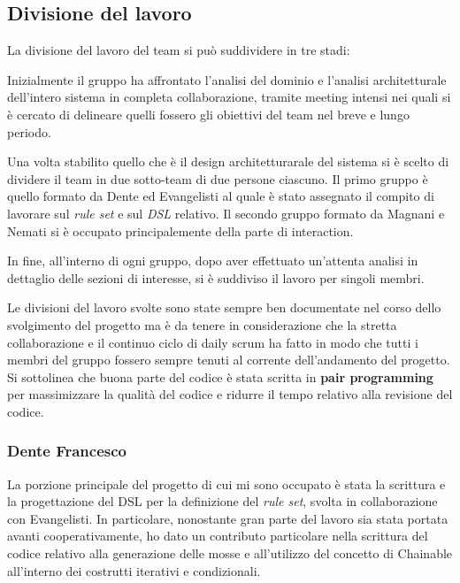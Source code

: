 
\subsection{Divisione del lavoro}
La divisione del lavoro del team si può suddividere in tre stadi:
%
\begin{inparaenum}[1)]
\item Inizialmente il gruppo ha affrontato l'analisi del dominio e l'analisi architetturale dell'intero sistema in completa collaborazione, tramite meeting intensi nei quali si è cercato di delineare quelli fossero gli obiettivi del team nel breve e lungo periodo.
%
\item Una volta stabilito quello che è il design architetturarale del sistema si è scelto di dividere il team in due sotto-team di due persone ciascuno.
%
Il primo gruppo è quello formato da Dente ed Evangelisti al quale è stato assegnato il compito di lavorare sul \textit{rule set} e sul \textit{DSL} relativo.
%
Il secondo gruppo formato da Magnani e Nemati si è occupato principalemente della parte di interaction.
%
\item In fine, all'interno di ogni gruppo, dopo aver effettuato un'attenta analisi in dettaglio delle sezioni di interesse, si è suddiviso il lavoro per singoli membri.
\end{inparaenum}

Le divisioni del lavoro svolte sono state sempre ben documentate nel corso dello svolgimento del progetto ma è da tenere in considerazione che la stretta collaborazione e il continuo ciclo di daily scrum ha fatto in modo che tutti i membri del gruppo fossero sempre tenuti al corrente dell'andamento del progetto.
%
Si sottolinea che buona parte del codice è stata scritta in \textbf{pair programming} per massimizzare la qualità del codice e ridurre il tempo relativo alla revisione del codice.

\subsubsection{Dente Francesco}

La porzione principale del progetto di cui mi sono occupato è stata la scrittura e la progettazione del DSL per la definizione del \textit{rule set}, svolta in collaborazione con Evangelisti.
%
In particolare, nonostante gran parte del lavoro sia stata portata avanti cooperativamente, ho dato un contributo particolare nella scrittura del codice relativo alla generazione delle mosse e all'utilizzo del concetto di Chainable all'interno dei costrutti iterativi e condizionali.

